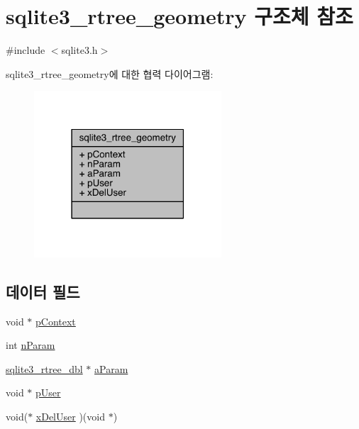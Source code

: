 \hypertarget{structsqlite3__rtree__geometry}{}\section{sqlite3\+\_\+rtree\+\_\+geometry 구조체 참조}
\label{structsqlite3__rtree__geometry}


{\ttfamily \#include $<$sqlite3.\+h$>$}



sqlite3\+\_\+rtree\+\_\+geometry에 대한 협력 다이어그램\+:
\nopagebreak
\begin{figure}[H]
\begin{center}
\leavevmode
\includegraphics[width=198pt]{d9/db2/structsqlite3__rtree__geometry__coll__graph}
\end{center}
\end{figure}
\subsection*{데이터 필드}
\begin{DoxyCompactItemize}
\item 
void $\ast$ \hyperlink{structsqlite3__rtree__geometry_a62fe439a49ed5b8628464c418f35f572}{p\+Context}
\item 
int \hyperlink{structsqlite3__rtree__geometry_ada7b9eba82660e3321dd4c93526697c9}{n\+Param}
\item 
\hyperlink{sqlite3_8h_ae9156ff58620c1ceae9391f1afabae1b}{sqlite3\+\_\+rtree\+\_\+dbl} $\ast$ \hyperlink{structsqlite3__rtree__geometry_a0a22e4b810cb1b8f1af792fd50493002}{a\+Param}
\item 
void $\ast$ \hyperlink{structsqlite3__rtree__geometry_add62e1cd5faa6000c815104af3c540d0}{p\+User}
\item 
void($\ast$ \hyperlink{structsqlite3__rtree__geometry_ae9835a39924a75b33cce9f6b10e1813f}{x\+Del\+User} )(void $\ast$)
\end{DoxyCompactItemize}


